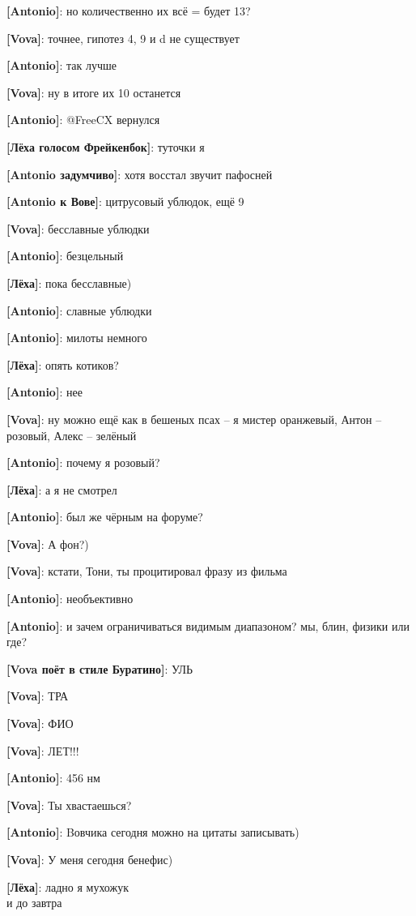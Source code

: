 \begin{flushleft}
\textbf{[Antonio]}: но количественно их всё = будет 13?

\textbf{[Vova]}: точнее, гипотез 4, 9  и d не существует

\textbf{[Antonio]}: так лучше

\textbf{[Vova]}: ну в итоге их 10 останется

\textbf{[Antonio]}: @FreeCX вернулся

\textbf{[Лёха голосом Фрейкенбок]}: туточки я

\textbf{[Antonio задумчиво]}: хотя восстал звучит пафосней

\textbf{[Antonio к Вове]}: цитрусовый ублюдок, ещё 9

\textbf{[Vova]}: бесславные ублюдки

\textbf{[Antonio]}: безцельный

\textbf{[Лёха]}: пока бесславные)

\textbf{[Antonio]}: славные ублюдки

\textbf{[Antonio]}: милоты немного

\textbf{[Лёха]}: опять котиков?

\textbf{[Antonio]}: нее

\textbf{[Vova]}: ну можно ещё как в бешеных псах -- я мистер оранжевый, Антон -- розовый, Алекс -- зелёный

\textbf{[Antonio]}: почему я розовый?

\textbf{[Лёха]}: а я не смотрел

\textbf{[Antonio]}: был же чёрным на форуме?

\textbf{[Vova]}: А фон?)

\textbf{[Vova]}: кстати, Тони, ты процитировал фразу из фильма

\textbf{[Antonio]}: необъективно

\textbf{[Antonio]}: и зачем ограничиваться видимым диапазоном? мы, блин, физики или где?

\textbf{[Vova поёт в стиле Буратино]}: УЛЬ

\textbf{[Vova]}: ТРА

\textbf{[Vova]}: ФИО

\textbf{[Vova]}: ЛЕТ!!!

\textbf{[Antonio]}: 456 нм

\textbf{[Vova]}: Ты хвастаешься?

\textbf{[Antonio]}: Bовчика сегодня можно на цитаты записывать)

\textbf{[Vova]}: У меня сегодня бенефис)

\textbf{[Лёха]}: ладно я мухожук\\
и до завтра


\end{flushleft}
